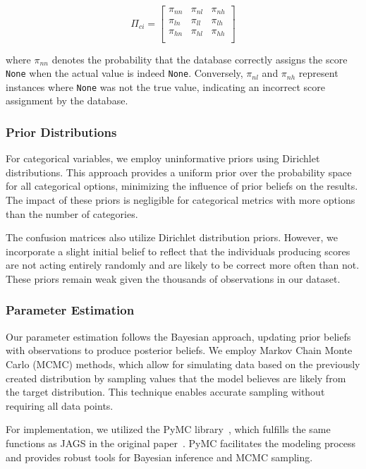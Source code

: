 \documentclass[12pt]{article}
\begin{document}
\begin{equation}\label{confusion_matrix_formula}
	\Pi_{ci} = \begin{bmatrix}
		\pi_{nn} & \pi_{nl} & \pi_{nh} \\
		\pi_{ln} & \pi_{ll} & \pi_{lh} \\
		\pi_{hn} & \pi_{hl} & \pi_{hh} \\
	\end{bmatrix}
\end{equation}

where $\pi_{nn}$ denotes the probability that the database correctly assigns the score \texttt{None}
when the actual value is indeed \texttt{None}. Conversely, $\pi_{nl}$ and $\pi_{nh}$ represent
instances where \texttt{None} was not the true value, indicating an incorrect score assignment by
the database.

\subsubsection{Prior Distributions}

For categorical variables, we employ uninformative priors using Dirichlet distributions. This
approach provides a uniform prior over the probability space for all categorical options, minimizing
the influence of prior beliefs on the results. The impact of these priors is negligible for
categorical metrics with more options than the number of categories.

The confusion matrices also utilize Dirichlet distribution priors. However, we incorporate a slight
initial belief to reflect that the individuals producing scores are not acting entirely randomly and
are likely to be correct more often than not. These priors remain weak given the thousands of
observations in our dataset.

\subsubsection{Parameter Estimation}

Our parameter estimation follows the Bayesian approach, updating prior beliefs with observations to
produce posterior beliefs. We employ Markov Chain Monte Carlo (MCMC) methods, which allow for
simulating data based on the previously created distribution by sampling values that the model
believes are likely from the target distribution. This technique enables accurate sampling without
requiring all data points.

For implementation, we utilized the PyMC library~\cite{pymc}, which fulfills the same functions as
JAGS in the original paper~\cite{bayes}. PyMC facilitates the modeling process and provides robust
tools for Bayesian inference and MCMC sampling.
\end{document}
